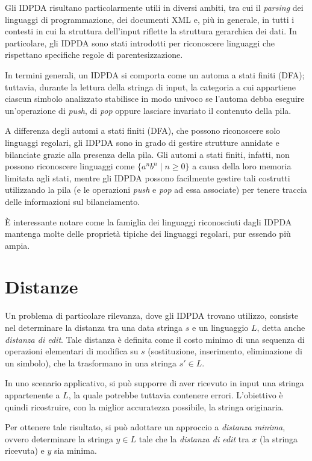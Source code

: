 \documentclass[a4paper,12pt]{report}
\theoremstyle{propositionstyle}
\begin{document}
    Gli IDPDA risultano particolarmente utili in diversi ambiti, tra cui il \emph{parsing} dei linguaggi di programmazione, dei documenti XML e, più in generale, in tutti i contesti in cui la struttura dell'input riflette la struttura gerarchica dei dati.
    In particolare, gli IDPDA sono stati introdotti per riconoscere linguaggi che rispettano specifiche regole di parentesizzazione.

    In termini generali, un IDPDA si comporta come un automa a stati finiti (DFA); tuttavia, durante la lettura della stringa di input, la categoria a cui appartiene ciascun simbolo analizzato stabilisce in modo univoco se l’automa debba eseguire un’operazione di \textit{push}, di \textit{pop} oppure lasciare invariato il contenuto della pila.

    A differenza degli automi a stati finiti (DFA), che possono riconoscere solo linguaggi regolari, gli IDPDA sono in grado di gestire strutture annidate e bilanciate grazie alla presenza della pila.
    Gli automi a stati finiti, infatti, non possono riconoscere linguaggi come $\{a^n b^n \mid n \geq 0\}$ a causa della loro memoria limitata agli stati, mentre gli IDPDA possono facilmente gestire tali costrutti utilizzando la pila (e le operazioni \textit{push} e \textit{pop} ad essa associate) per tenere traccia delle informazioni sul bilanciamento.

    È interessante notare come la famiglia dei linguaggi riconosciuti dagli IDPDA mantenga molte delle proprietà tipiche dei linguaggi regolari, pur essendo più ampia.


    \section{Distanze}

    Un problema di particolare rilevanza, dove gli IDPDA trovano utilizzo, consiste nel determinare la distanza tra una data stringa $s$ e un linguaggio $L$, detta anche \textit{distanza di edit}.
    Tale distanza è definita come il costo minimo di una sequenza di operazioni elementari di modifica su $s$ (sostituzione, inserimento, eliminazione di un simbolo), che la trasformano in una stringa $s' \in L$.

    In uno scenario applicativo, si può supporre di aver ricevuto in input una stringa appartenente a $L$, la quale potrebbe tuttavia contenere errori.
    L'obiettivo è quindi ricostruire, con la miglior accuratezza possibile, la stringa originaria.

    Per ottenere tale risultato, si può adottare un approccio a \emph{distanza minima}, ovvero determinare la stringa $y \in L$ tale che la \textit{distanza di edit} tra $x$ (la stringa ricevuta) e $y$ sia minima.
\end{document}
